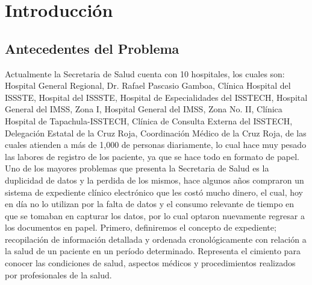\chapter{Introducción}

\section{Antecedentes del Problema}
Actualmente la Secretaria de Salud  cuenta con 10 hospitales, los cuales son: Hospital General Regional, Dr. Rafael Pascasio Gamboa, Clínica Hospital del ISSSTE, Hospital del ISSSTE, Hospital de Especialidades del ISSTECH, Hospital General del IMSS, Zona I, Hospital General del IMSS, Zona No. II, Clínica Hospital de Tapachula-ISSTECH, Clínica de Consulta Externa del ISSTECH, Delegación Estatal de la Cruz Roja, Coordinación Médico de la Cruz Roja, de las cuales atienden a más de 1,000 de personas diariamente, lo cual hace muy pesado las labores de registro de los paciente, ya que se hace todo en formato de papel. Uno de los mayores problemas que presenta la Secretaria de Salud es la duplicidad de datos y la perdida de los mismos, hace algunos años compraron un sistema de expediente clínico electrónico que les costó mucho dinero, el cual, hoy en día no lo utilizan por la falta de datos y el consumo relevante de tiempo en que se tomaban en capturar los datos, por lo cual optaron nuevamente regresar a los documentos en papel.
Primero, definiremos el concepto de expediente; recopilación de información detallada y ordenada cronológicamente con relación a la salud de un paciente en un período determinado. Representa el cimiento para conocer las condiciones de salud, aspectos médicos y procedimientos realizados por profesionales de la salud.\cite{Gracia}

